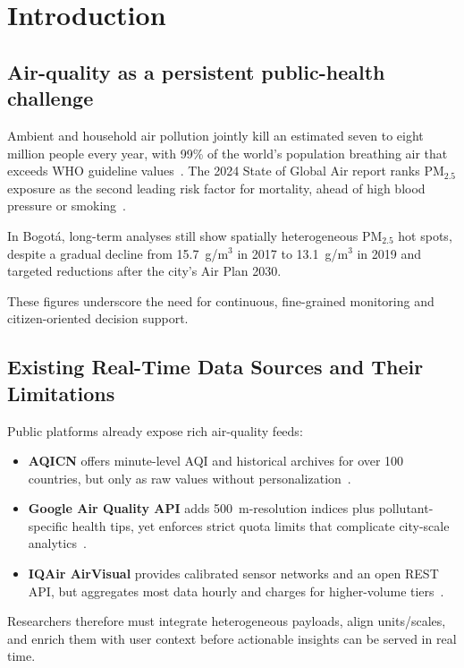 \section{Introduction}

\subsection{Air-quality as a persistent public-health challenge}

Ambient and household air pollution jointly kill an estimated seven to eight million people every year, with 99\% of the world’s population breathing air that exceeds WHO guideline values~\cite{whopollution}. The 2024 State of Global Air report ranks PM$_{2.5}$ exposure as the second leading risk factor for mortality, ahead of high blood pressure or smoking~\cite{state}. 

In Bogotá, long-term analyses still show spatially heterogeneous PM$_{2.5}$ hot spots, despite a gradual decline from 15.7~\textmu g/m$^3$ in 2017 to 13.1~\textmu g/m$^3$ in 2019 and targeted reductions after the city’s Air Plan 2030.

These figures underscore the need for continuous, fine-grained monitoring and citizen-oriented decision support.

\subsection{Existing Real-Time Data Sources and Their Limitations}

Public platforms already expose rich air-quality feeds:
\begin{itemize}
    \item \textbf{AQICN} offers minute-level AQI and historical archives for over 100 countries, but only as raw values without personalization~\cite{aqicn}.
    \item \textbf{Google Air Quality API} adds 500~m-resolution indices plus pollutant-specific health tips, yet enforces strict quota limits that complicate city-scale analytics~\cite{google}.
    \item \textbf{IQAir AirVisual} provides calibrated sensor networks and an open REST API, but aggregates most data hourly and charges for higher-volume tiers~\cite{iqairapi}.
\end{itemize}

Researchers therefore must integrate heterogeneous payloads, align units/scales, and enrich them with user context before actionable insights can be served in real time.


